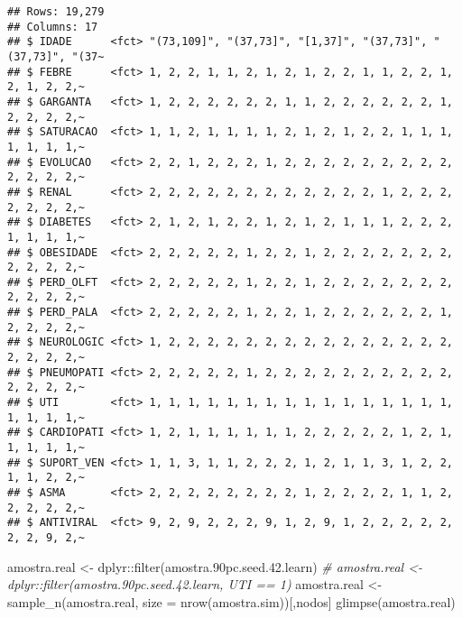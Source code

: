 \documentclass[
]{article}
\newenvironment{Shaded}{\begin{snugshade}}{\end{snugshade}}
\newcommand{\AttributeTok}[1]{\textcolor[rgb]{0.77,0.63,0.00}{#1}}
\newcommand{\CommentTok}[1]{\textcolor[rgb]{0.56,0.35,0.01}{\textit{#1}}}
\newcommand{\FloatTok}[1]{\textcolor[rgb]{0.00,0.00,0.81}{#1}}
\newcommand{\FunctionTok}[1]{\textcolor[rgb]{0.00,0.00,0.00}{#1}}
\newcommand{\NormalTok}[1]{#1}
\newcommand{\OtherTok}[1]{\textcolor[rgb]{0.56,0.35,0.01}{#1}}
\newcommand{\SpecialCharTok}[1]{\textcolor[rgb]{0.00,0.00,0.00}{#1}}
\begin{document}
\begin{verbatim}
## Rows: 19,279
## Columns: 17
## $ IDADE      <fct> "(73,109]", "(37,73]", "[1,37]", "(37,73]", "(37,73]", "(37~
## $ FEBRE      <fct> 1, 2, 2, 1, 1, 2, 1, 2, 1, 2, 2, 1, 1, 2, 2, 1, 2, 1, 2, 2,~
## $ GARGANTA   <fct> 1, 2, 2, 2, 2, 2, 2, 1, 1, 2, 2, 2, 2, 2, 2, 1, 2, 2, 2, 2,~
## $ SATURACAO  <fct> 1, 1, 2, 1, 1, 1, 1, 2, 1, 2, 1, 2, 2, 1, 1, 1, 1, 1, 1, 1,~
## $ EVOLUCAO   <fct> 2, 2, 1, 2, 2, 2, 1, 2, 2, 2, 2, 2, 2, 2, 2, 2, 2, 2, 2, 2,~
## $ RENAL      <fct> 2, 2, 2, 2, 2, 2, 2, 2, 2, 2, 2, 2, 1, 2, 2, 2, 2, 2, 2, 2,~
## $ DIABETES   <fct> 2, 1, 2, 1, 2, 2, 1, 2, 1, 2, 1, 1, 1, 2, 2, 2, 1, 1, 1, 1,~
## $ OBESIDADE  <fct> 2, 2, 2, 2, 2, 1, 2, 2, 1, 2, 2, 2, 2, 2, 2, 2, 2, 2, 2, 2,~
## $ PERD_OLFT  <fct> 2, 2, 2, 2, 2, 1, 2, 2, 1, 2, 2, 2, 2, 2, 2, 2, 2, 2, 2, 2,~
## $ PERD_PALA  <fct> 2, 2, 2, 2, 2, 1, 2, 2, 1, 2, 2, 2, 2, 2, 2, 1, 2, 2, 2, 2,~
## $ NEUROLOGIC <fct> 1, 2, 2, 2, 2, 2, 2, 2, 2, 2, 2, 2, 2, 2, 2, 2, 2, 2, 2, 2,~
## $ PNEUMOPATI <fct> 2, 2, 2, 2, 2, 1, 2, 2, 2, 2, 2, 2, 2, 2, 2, 2, 2, 2, 2, 2,~
## $ UTI        <fct> 1, 1, 1, 1, 1, 1, 1, 1, 1, 1, 1, 1, 1, 1, 1, 1, 1, 1, 1, 1,~
## $ CARDIOPATI <fct> 1, 2, 1, 1, 1, 1, 1, 1, 2, 2, 2, 2, 2, 1, 2, 1, 1, 1, 1, 1,~
## $ SUPORT_VEN <fct> 1, 1, 3, 1, 1, 2, 2, 2, 1, 2, 1, 1, 3, 1, 2, 2, 1, 1, 2, 2,~
## $ ASMA       <fct> 2, 2, 2, 2, 2, 2, 2, 2, 1, 2, 2, 2, 2, 1, 1, 2, 2, 2, 2, 2,~
## $ ANTIVIRAL  <fct> 9, 2, 9, 2, 2, 2, 9, 1, 2, 9, 1, 2, 2, 2, 2, 2, 2, 2, 9, 2,~
\end{verbatim}

\begin{Shaded}
\begin{Highlighting}[]
\NormalTok{amostra.real }\OtherTok{\textless{}{-}}\NormalTok{ dplyr}\SpecialCharTok{::}\FunctionTok{filter}\NormalTok{(amostra}\FloatTok{.90}\NormalTok{pc.seed.}\FloatTok{42.}\NormalTok{learn)}
\CommentTok{\# amostra.real \textless{}{-} dplyr::filter(amostra.90pc.seed.42.learn, UTI == 1)  }
\NormalTok{amostra.real }\OtherTok{\textless{}{-}} \FunctionTok{sample\_n}\NormalTok{(amostra.real, }
                         \AttributeTok{size =} \FunctionTok{nrow}\NormalTok{(amostra.sim))[,nodos]}
\FunctionTok{glimpse}\NormalTok{(amostra.real)}
\end{Highlighting}
\end{Shaded}
\end{document}
